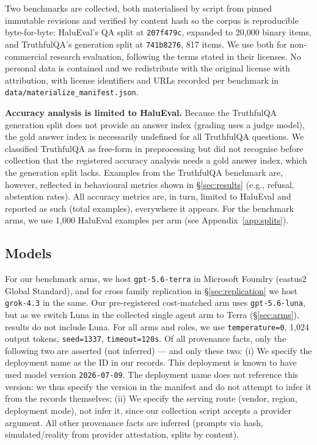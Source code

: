 Two benchmarks are collected, both materialised by script from pinned immutable revisions and
verified by content hash so the corpus is reproducible byte-for-byte: HaluEval's QA split
\citep{li2023halueval} at \texttt{207f479c}, expanded to 20,000 binary items, and TruthfulQA's
generation split \citep{lin2022truthfulqa} at \texttt{741b8276}, 817 items. We use both for
non-commercial research evaluation, following the terms stated in their licenses. No personal data
is contained and we redistribute with the original license with attribution, with license
identifiers and URLs recorded per benchmark in \texttt{data/materialize\_manifest.json}.

\textbf{Accuracy analysis is limited to HaluEval.} Because the TruthfulQA generation split does not
provide an answer index (grading uses a judge model), the gold answer index is necessarily undefined
for all TruthfulQA questions. We classified TruthfulQA as free-form in preprocessing but did not
recognise before collection that the registered accuracy analysis needs a gold answer index, which
the generation split lacks. Examples from the TruthfulQA benchmark are, however, reflected in
behavioural metrics shown in \S\ref{sec:results} (e.g., refusal, abstention rates). All accuracy
metrics are, in turn, limited to HaluEval and reported as such (total examples), everywhere it
appears. For the benchmark arms, we use 1,000 HaluEval examples per arm (see
Appendix~\ref{app:splits}).

\subsection{Models}
\label{sec:models}

For our benchmark arms, we host \texttt{gpt-5.6-terra} in Microsoft Foundry (eastus2 Global
Standard), and for cross family replication in \S\ref{sec:replication} we host \texttt{grok-4.3} in
the same. Our pre-registered cost-matched arm uses \texttt{gpt-5.6-luna}, but as we switch Luna in
the collected single agent arm to Terra (\S\ref{sec:arms}), results do not include Luna. For all
arms and roles, we use \texttt{temperature=0}, 1,024 output tokens, \texttt{seed=1337},
\texttt{timeout=120s}. Of all provenance facts, only the following two are asserted (not inferred)
--- and only these two: (i) We specify the deployment name as the ID in our records. This deployment
is known to have used model version \texttt{2026-07-09}. The deployment name does not reference this
version: we thus specify the version in the manifest and do not attempt to infer it from the records
themselves; (ii) We specify the serving route (vendor, region, deployment mode), not infer it, since
our collection script accepts a provider argument. All other provenance facts are inferred (prompts
via hash, simulated/reality from provider attestation, splits by content).

